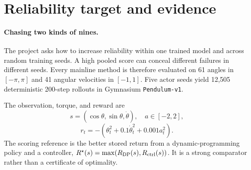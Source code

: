 \maketitle
\vspace{-1.5em}

\begin{abstract}
Reliable reinforcement learning must work across initial states and independent training seeds. We evaluate five trained actors on the same 2,501-state Pendulum grid. The selected reinforcement-learning-plus-supervision recipe combines learner-state DAgger, automatic follow-up on measured weak starts, and conservative local critic search. It succeeds near the reference on 12,496 of 12,505 seed-state trials, or 99.928\%. The selected pure-RL recipe combines SimbaV2, FastSACN8 critic training, symmetry, and twin-critic action search. It reaches 12,008 trials, or 96.026\%. Task-success rates are 93.858\% and 92.875\%; strict reference wins are 12.555\% and 22.823\%. Matched ablations show that critic search repairs many decisions missed by the pure-RL actor, while the raw actor becomes less reliable and more saturated. On failure-conditioned states, multi-step actors retain about 7\% of a nominal local critic step after action-bound projection. The reference-prefix intervention repairs 19.1\% of failures with one state-matched action and 99.0\% with 32, showing that the selected raw-actor failures generally require an ordered, state-matched correction sequence.
\end{abstract}

\section{Reliability target and evidence}

\paragraph{Chasing two kinds of nines.}
The project asks how to increase reliability within one trained model and across random training seeds. A high pooled score can conceal different failures in different seeds. Every mainline method is therefore evaluated on 61 angles in $[-\pi,\pi]$ and 41 angular velocities in $[-1,1]$. Five actor seeds yield 12,505 deterministic 200-step rollouts in Gymnasium \texttt{Pendulum-v1}.

The observation, torque, and reward are
\[
s=(\cos\theta,\sin\theta,\dot\theta),\quad a\in[-2,2],
\]
\[
r_t=-(\theta_t^2+0.1\dot\theta_t^2+0.001a_t^2).
\]
The scoring reference is the better stored return from a dynamic-programming policy and a controller,
$R^\star(s)=\max(R_{\rm DP}(s),R_{\rm ctrl}(s))$.
It is a strong comparator rather than a certificate of optimality.

